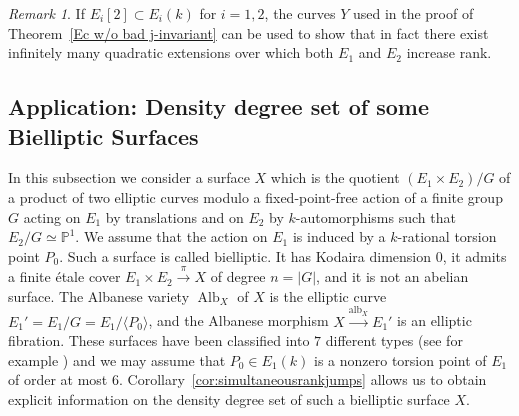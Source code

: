 \documentclass[a4paper,11pt]{amsart}
\theoremstyle{plain}
\theoremstyle{remark}
\newtheorem{remark}[thm]{Remark}
\DeclareMathOperator{\Alb}{Alb}
\DeclareMathOperator{\alb}{alb}
\newcommand{\defi}[1]{\textsf{#1}} %
\begin{document}
\begin{remark}
If \(E_i[2] \subset E_i(k)\) for \(i=1,2\), the curves \(Y\) used in the proof of Theorem~\ref{Ec w/o bad j-invariant} can be used to show that in fact there exist infinitely many quadratic extensions over which both \(E_1\) and \(E_2\) increase rank.
\end{remark}

\subsection{Application: Density degree set of some Bielliptic Surfaces} \label{dendegsonbielliptic}
In this subsection we consider a surface $X$ which is the quotient $(E_1\times E_2)/G$ of a product of two elliptic curves modulo a fixed-point-free action of a finite group $G$ acting on $E_1$ by translations and on $E_2$ by $k$-automorphisms such that $E_2/G\simeq\mathbb{P}^1$. 
We assume that the action on $E_1$ is induced by a $k$-rational torsion point $P_0$. 
Such a surface is called \defi{bielliptic}. It has Kodaira dimension $0$, it admits a finite \'{e}tale cover $E_1\times E_2\xrightarrow{\pi} X$ of degree $n=|G|$, and it is not an abelian surface. 
The Albanese variety $\Alb_X$ of $X$ is the elliptic curve $E_1'=E_1/G=E_1/\langle P_0\rangle$, and the Albanese morphism $X\xrightarrow{\alb_X}E_1'$ is an elliptic fibration.  
These surfaces have been classified into $7$ different types (see for example \cite{Cil}) and we may assume that $P_0\in E_1(k)$ is a nonzero torsion point of $E_1$ of order at most $6$.
Corollary~\ref{cor:simultaneousrankjumps} allows us to obtain explicit information on the density degree set of such a bielliptic surface $X$.
\end{document}
